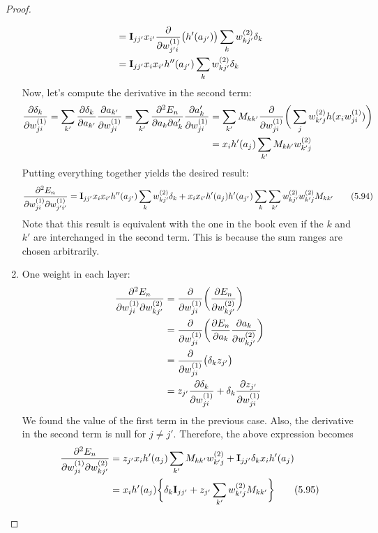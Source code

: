 \begin{proof}
\begin{enumerate}
\begin{align*}
            &= \mathbf{I}_{jj'} x_{i'} \pdv{w_{j'i}^{(1)}} \big(h'(a_{j'})\big) \sum_{k} w_{kj'}^{(2)} \delta_k \\
            &= \mathbf{I}_{jj'} x_i x_{i'} h''(a_{j'}) \sum_{k} w_{kj'}^{(2)} \delta_k
        \end{align*}
        Now, let's compute the derivative in the second term:
        \begin{align*}
            \pdv{\delta_k}{w_{ji}^{(1)}} 
            = \sum_{k'} \pdv{\delta_k}{a_{k'}} \pdv{a_{k'}}{w_{ji}^{(1)}}
            = \sum_{k'} \pdv{E_n}{a_k}{a_k'} \pdv{a_k'}{w_{ji}^{(1)}}
            &= \sum_{k'} M_{kk'} \pdv{w_{ji}^{(1)}}\bigg(\sum_{j} w_{k'j}^{(2)} h(x_i w_{ji}^{(1)})\bigg) \\
            &= x_i h'(a_j) \sum_{k'} M_{kk'} w_{k'j}^{(2)}
        \end{align*}
        Putting everything together yields the desired result:
        \begin{align*}
            \pdv{E_n}{w_{ji}^{(1)}}{w_{j'i'}^{(1)}}
            = \mathbf{I}_{jj'} x_i x_{i'} h''(a_{j'}) \sum_{k} w_{kj'}^{(2)} \delta_k +
            x_i x_{i'} h'(a_j) h'(a_{j'}) \sum_{k} \sum_{k'} w_{kj'}^{(2)} w_{k'j}^{(2)} M_{kk'}
            \label{eq:5.94}\tag{5.94}
        \end{align*}
        Note that this result is equivalent with the one in the book even if the $k$ and $k'$ are
        interchanged in the second term. This is because the sum ranges are chosen arbitrarily.
    \item One weight in each layer:
        \begin{align*}
            \pdv{E_n}{w_{ji}^{(1)}}{w_{kj'}^{(2)}}
            &= \pdv{w_{ji}^{(1)}} \bigg(\pdv{E_n}{w_{kj'}^{(2)}}\bigg) \\
            &= \pdv{w_{ji}^{(1)}} \bigg(\pdv{E_n}{a_{k}} \pdv{a_k}{w_{kj'}^{(2)}}\bigg) \\
            &= \pdv{w_{ji}^{(1)}} \big(\delta_{k} z_{j'}\big) \\ 
            &= z_{j'} \pdv{\delta_k}{w_{ji}^{(1)}} + \delta_k \pdv{z_{j'}}{w_{ji}^{(1)}}
        \end{align*}
        We found the value of the first term in the previous case. Also, the derivative
        in the second term is null for $j \neq j'$. Therefore, the above expression becomes
        \begin{align*}
            \pdv{E_n}{w_{ji}^{(1)}}{w_{kj'}^{(2)}}
            &= z_{j'} x_i h'(a_j) \sum_{k'} M_{kk'} w_{k'j}^{(2)} + 
            \mathbf{I}_{jj'} \delta_k x_i h'(a_j) \\
            &= x_i h'(a_j) \bigg\{\delta_k \mathbf{I}_{jj'} + z_{j'} \sum_{k'} w_{k'j}^{(2)} M_{kk'}\bigg\} 
            \label{eq:5.95}\tag{5.95}
        \end{align*}
    \end{enumerate}
\end{proof}


